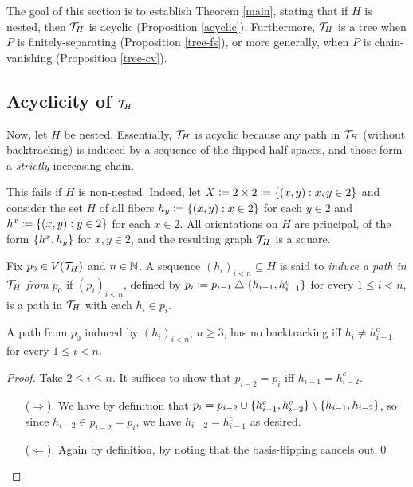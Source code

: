 \documentclass{amsart}
\begin{document}
    The goal of this section is to establish Theorem \ref{main}, stating that if $H$ is nested, then $\mathcal{T}_H$ is acyclic (Proposition \ref{acyclic}). Furthermore, $\mathcal{T}_H$ is a tree when $P$ is finitely-separating (Proposition \ref{tree-fs}), or more generally, when $P$ is chain-vanishing (Proposition \ref{tree-cv}).

    \subsection{Acyclicity of $\mathcal{T}_H$}

    Now, let $H$ be nested. Essentially, $\mathcal{T}_H$ is acyclic because any path in $\mathcal{T}_H$ (without backtracking) is induced by a sequence of the flipped half-spaces, and those form a \textit{strictly}-increasing chain.

    \begin{example}
        This fails if $H$ is non-nested. Indeed, let $X\coloneqq2\times2\coloneqq\left\{(x,y): x,y\in2\right\}$ and consider the set $H$ of all fibers $h_y\coloneqq\left\{(x,y): x\in2\right\}$ for each $y\in2$ and $h^x\coloneqq\left\{(x,y): y\in2\right\}$ for each $x\in2$. All orientations on $H$ are principal, of the form $\left\{h^x,h_y\right\}$ for $x,y\in2$, and the resulting graph $\mathcal{T}_H$ is a square.
    \end{example}

    \begin{definition}
        Fix $p_0\in V(\mathcal{T}_H)$ and $n\in\mathbb{N}$. A sequence $(h_i)_{i<n}\subseteq H$ is said to \textit{induce a path in $\mathcal{T}_H$ from $p_0$} if $(p_i)_{i<n}$, defined by $p_i\coloneqq p_{i-1}\bigtriangleup\{h_{i-1},h_{i-1}^c\}$ for every $1\leq i<n$, is a path in $\mathcal{T}_H$ with each $h_i\in p_i$.
    \end{definition}

    \begin{lemma}\label{no-backtrack}
        A path from $p_0$ induced by $(h_i)_{i<n}$, $n\geq3$, has no backtracking iff $h_i\neq h_{i-1}^c$ for every $1\leq i<n$.
    \end{lemma}
    \begin{proof}
        Take $2\leq i\leq n$. It suffices to show that $p_{i-2}=p_i$ iff $h_{i-1}=h_{i-2}^c$.
        \begin{itemize}
            \item[($\Rightarrow$).] We have by definition that $p_i=p_{i-2}\cup\{h_{i-1}^c,h_{i-2}^c\}\setminus\left\{h_{i-1},h_{i-2}\right\}$, so since $h_{i-2}\in p_{i-2}=p_i$, we have $h_{i-2}=h_{i-1}^c$ as desired.
            \item[($\Leftarrow$).] Again by definition, by noting that the basis-flipping cancels out.\qed
        \end{itemize}
    \end{proof}
\end{document}
